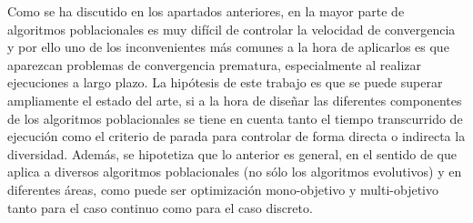 
Como se ha discutido en los apartados anteriores, en la mayor parte de algoritmos poblacionales es muy difícil de controlar
la velocidad de convergencia y por ello uno de los inconvenientes más comunes a la hora de aplicarlos es que aparezcan problemas
de convergencia prematura, especialmente al realizar ejecuciones a largo plazo.
%
La hipótesis de este trabajo es que se puede superar ampliamente el estado del arte, si a la hora de diseñar las diferentes
componentes de los algoritmos poblacionales se tiene en cuenta tanto el tiempo transcurrido de ejecución como el criterio de parada
para controlar de forma directa o indirecta la diversidad.
%
Además, se hipotetiza que lo anterior es general, en el sentido de que aplica a diversos algoritmos poblacionales (no sólo los 
algoritmos evolutivos) y en diferentes áreas, como puede ser optimización mono-objetivo y multi-objetivo tanto para el caso
continuo como para el caso discreto.
